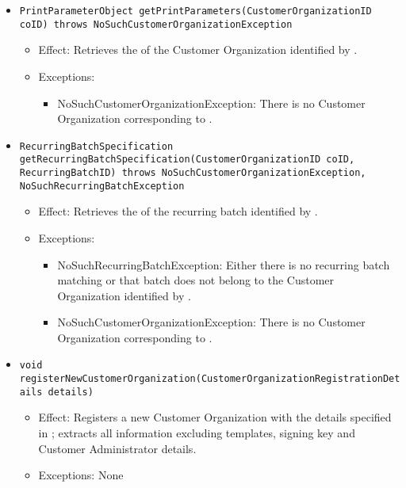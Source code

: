 \begin{itemize}
\begin{itemize}
		\item \texttt{PrintParameterObject getPrintParameters(CustomerOrganizationID coID) throws NoSuchCustomerOrganizationException}
		    \begin{itemize}
                \item Effect: Retrieves the  of the Customer Organization identified by .
                \item Exceptions:
				\begin{itemize}
					\item NoSuchCustomerOrganizationException: There is no Customer Organization corresponding to .
				\end{itemize}
            \end{itemize}

		\item \texttt{RecurringBatchSpecification getRecurringBatchSpecification(CustomerOrganizationID coID, RecurringBatchID) throws NoSuchCustomerOrganizationException, NoSuchRecurringBatchException}
		    \begin{itemize}
                \item Effect: Retrieves the  of the recurring batch identified by .
                \item Exceptions:
					\begin{itemize}
						\item NoSuchRecurringBatchException: Either there is no recurring batch matching  or that batch does not belong to the Customer Organization identified by .
						\item NoSuchCustomerOrganizationException: There is no Customer Organization corresponding to .
					\end{itemize}
            \end{itemize}

		\item \texttt{void registerNewCustomerOrganization(CustomerOrganizationRegistrationDetails details)}
		    \begin{itemize}
                \item Effect: Registers a new Customer Organization with the details specified in ; extracts all information excluding templates, signing key and Customer Administrator details.
                \item Exceptions: None
            \end{itemize}


\end{itemize}
\end{itemize}
